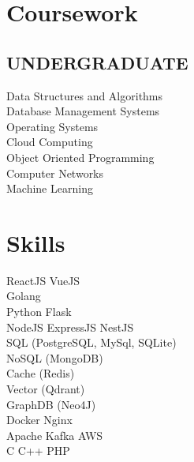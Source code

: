\documentclass{deedy-resume-openfont}
\begin{document}
\begin{minipage}[t]{0.33\textwidth}
\sectionsep
\section{Coursework}
\subsection{UNDERGRADUATE}
Data Structures and Algorithms\\
Database Management Systems\\
Operating Systems\\
Cloud Computing\\
Object Oriented Programming\\
Computer Networks\\
Machine Learning\\
\sectionsep


\section{Skills}
\textbullet{} ReactJS \textbullet{} VueJS \\
\textbullet{} Golang \\
\textbullet{} Python \textbullet{} Flask\\
\textbullet{} NodeJS \textbullet{} ExpressJS \textbullet{} NestJS\\ 
\textbullet{} SQL (PostgreSQL, MySql, SQLite) \\ 
\textbullet{} NoSQL (MongoDB) \\ 
\textbullet{} Cache (Redis)  \\ 
\textbullet{} Vector (Qdrant) \\
\textbullet{} GraphDB (Neo4J) \\ 
\textbullet{} Docker \textbullet{} Nginx \\
\textbullet{} Apache Kafka \textbullet{} AWS \\
\textbullet{} C \textbullet{} C++ \textbullet{} PHP\\

\sectionsep


\end{minipage} 
\end{document}
